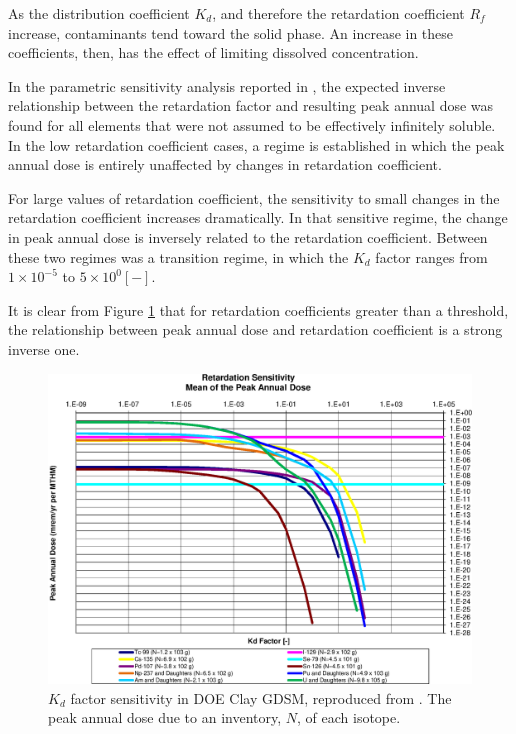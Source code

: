 

As the distribution coefficient $K_d$, and therefore the retardation
coefficient $R_f$ increase, contaminants tend toward the solid phase. An
increase in these coefficients, then, has the effect of limiting dissolved
concentration.

In the parametric sensitivity analysis reported in \cite{huff_key_2012},
the expected inverse relationship between the retardation factor and resulting
peak annual dose was found for all elements that were not assumed to be
effectively infinitely soluble.  In the low retardation coefficient cases, a
regime is established in which the peak annual dose is entirely unaffected by
changes in retardation coefficient.

For large values of retardation coefficient, the sensitivity to small changes
in the retardation coefficient increases dramatically. In that sensitive
regime, the change in peak annual dose is inversely related to the retardation
coefficient. Between these two regimes was a transition regime, in which the
$K_d$ factor ranges from $1\times10^{-5}$ to $5\times10^{0} [-]$.

It is clear from Figure \ref{fig:KdSumFactor} that
for retardation coefficients greater than a threshold, the
relationship between peak annual dose and retardation coefficient is a strong
inverse one.

\begin{figure}[ht]
\centering
\includegraphics[width=0.7\linewidth]{./results/images/Retardation_Summary_kdFactor.eps}
\caption[$K_d$ factor sensitivity in Clay GDSM]{$K_d$ factor sensitivity in 
        DOE Clay GDSM, reproduced from \cite{huff_key_2012}.
The peak annual dose due to an inventory,
$N$, of each isotope.}
\label{fig:KdSumFactor}
\end{figure}

\FloatBarrier
